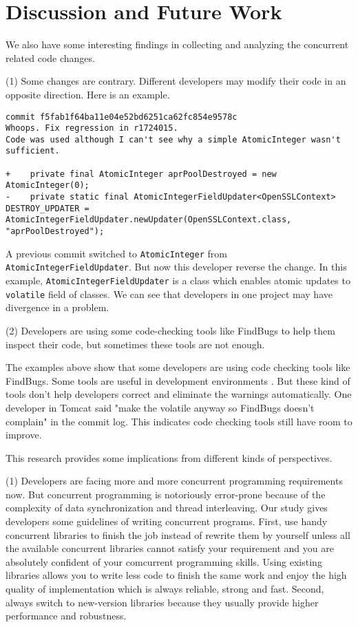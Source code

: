 \section{Discussion and Future Work}
We also have some interesting findings in collecting and analyzing the concurrent related code changes.

(1) Some changes are contrary. Different developers may modify their code in an opposite direction. Here is an example.

\begin{lstlisting}
commit f5fab1f64ba11e04e52bd6251ca62fc854e9578c
Whoops. Fix regression in r1724015.
Code was used although I can't see why a simple AtomicInteger wasn't sufficient.

+    private final AtomicInteger aprPoolDestroyed = new AtomicInteger(0);
-    private static final AtomicIntegerFieldUpdater<OpenSSLContext> DESTROY_UPDATER = AtomicIntegerFieldUpdater.newUpdater(OpenSSLContext.class, "aprPoolDestroyed");
\end{lstlisting}

A previous commit switched to \texttt{AtomicInteger} from \texttt{AtomicIntegerFieldUpdater}. But now this developer reverse the change. In this example, \texttt{AtomicIntegerFieldUpdater} is a class which enables atomic updates to \texttt{volatile} field of classes. We can see that developers in one project may have divergence in a problem.

(2) Developers are using some code-checking tools like FindBugs to help them inspect their code, but sometimes these tools are not enough.

The examples above show that some developers are using code checking tools like FindBugs. Some tools are useful in development environments \cite{conf/oopsla/AyewahPMPZ07}. But these kind of tools don't help developers correct and eliminate the warnings automatically. One developer in Tomcat said "make the volatile anyway so FindBugs doesn't complain" in the commit log. This indicates code checking tools still have room to improve.

This research provides some implications from different kinds of perspectives.

(1) Developers are facing more and more concurrent programming requirements now. But concurrent programming is notoriously error-prone because of the complexity of data synchronization and thread interleaving. Our study gives developers some guidelines of writing concurrent programs. First, use handy concurrent libraries to finish the job instead of rewrite them by yourself unless all the available concurrent libraries cannot satisfy your requirement and you are absolutely confident of your comcurrent programming skills. Using existing libraries allows you to  write less code to finish the same work and enjoy the high quality of implementation which is always reliable, strong and fast. Second, always switch to new-version libraries because they usually provide higher performance and robustness.

